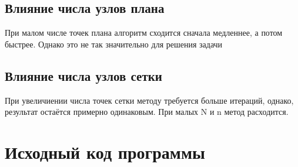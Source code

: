 \subsection{Влияние числа узлов плана}

При малом числе точек плана алгоритм сходится сначала медленнее, а потом быстрее.
Однако это не так значительно для решения задачи
\vspace{30mm}



\subsection{Влияние числа узлов сетки}

При увеличиении числа точек сетки методу требуется больше итераций, однако,
результат остаётся примерно одинаковым.
При малых N и n метод расходится.



\section{Исходный код программы}

